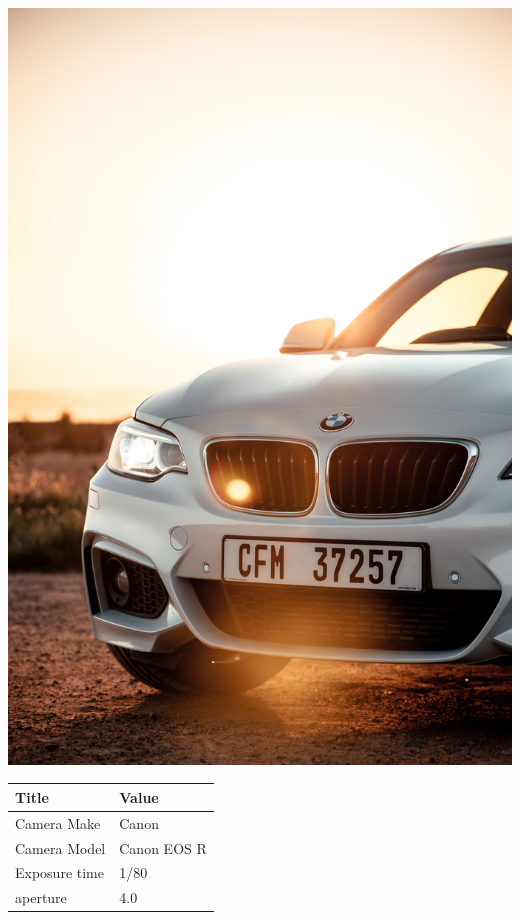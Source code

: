 \documentclass[twocolumn]{article}
\begin{document}
\begin{center}
\includegraphics[width=0.7\columnwidth]{Image9}
\newline
\newline
\newline
\newline
\newline
\begin{tabular}{| m{3cm} | m{3cm} |}
\hline

Title  &  Value   \\

\hline
Camera Make  & Canon   \\
\hline
Camera Model  & Canon EOS R   \\
\hline
Exposure time  & 1/80  \\
\hline
aperture & 4.0 \\
\hline


\end{tabular}


\end{center}

\pagebreak
\end{document}
